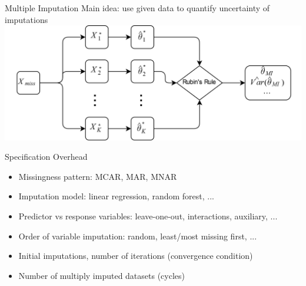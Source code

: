 \documentclass[aspectratio=43]{beamer}
\begin{document}
\begin{frame}{Multiple Imputation}
Main idea: use given data to quantify uncertainty of imputations
\phantom{This text will be invisible} \\
\centering
\includegraphics[width=0.9\paperwidth]{MI}
\end{frame}

\begin{frame}{Specification Overhead}
\begin{itemize}
\item Missingness pattern: MCAR, MAR, MNAR
\item Imputation model: linear regression, random forest, ...
\item Predictor vs response variables: leave-one-out, interactions, auxiliary, ...
\item Order of variable imputation: random, least/most missing first, ...
\item Initial imputations, number of iterations (convergence condition)
\item Number of multiply imputed datasets (cycles)
\end{itemize}
\end{frame}
\end{document}
